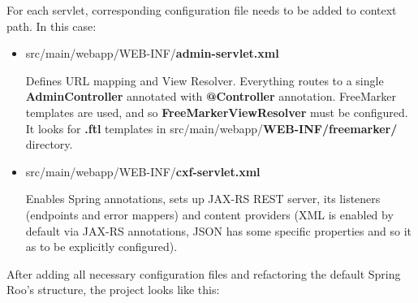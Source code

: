 	For each servlet, corresponding configuration file needs to be added to context path. In this case:
	
	\begin{itemize}
		\item src/main/webapp/WEB-INF/\textbf{admin-servlet.xml}
		
		Defines URL mapping and View Resolver. Everything routes to a single \textbf{AdminController} annotated with
		\textbf{@Controller} annotation. FreeMarker templates are used, and so \textbf{FreeMarkerViewResolver} must be
		configured. It looks for \textbf{.ftl} templates in src/main/webapp/\textbf{WEB-INF/freemarker/} directory.
		\item src/main/webapp/WEB-INF/\textbf{cxf-servlet.xml}
		
		Enables Spring annotations, sets up JAX-RS REST server, its listeners (endpoints and error mappers) and content
		providers (XML is enabled by default via JAX-RS annotations, JSON has some specific properties and so it as to be
		explicitly configured).
	\end{itemize}
	
	After adding all necessary configuration files and refactoring the default Spring Roo's structure, the project looks
	like this:
	
